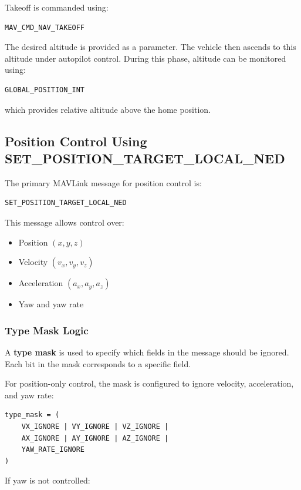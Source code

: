 Takeoff is commanded using:

\begin{verbatim}
MAV_CMD_NAV_TAKEOFF
\end{verbatim}

The desired altitude is provided as a parameter. The vehicle then ascends to this altitude under autopilot control. During this phase, altitude can be monitored using:

\begin{verbatim}
GLOBAL_POSITION_INT
\end{verbatim}

which provides relative altitude above the home position.

\subsection{Position Control Using SET\_POSITION\_TARGET\_LOCAL\_NED}

The primary MAVLink message for position control is:

\begin{verbatim}
SET_POSITION_TARGET_LOCAL_NED
\end{verbatim}

This message allows control over:
\begin{itemize}
    \item Position $(x, y, z)$
    \item Velocity $(v_x, v_y, v_z)$
    \item Acceleration $(a_x, a_y, a_z)$
    \item Yaw and yaw rate
\end{itemize}

\subsubsection{Type Mask Logic}

A \textbf{type mask} is used to specify which fields in the message should be ignored. Each bit in the mask corresponds to a specific field.

For position-only control, the mask is configured to ignore velocity, acceleration, and yaw rate:

\begin{verbatim}
type_mask = (
    VX_IGNORE | VY_IGNORE | VZ_IGNORE |
    AX_IGNORE | AY_IGNORE | AZ_IGNORE |
    YAW_RATE_IGNORE
)
\end{verbatim}

If yaw is not controlled:

